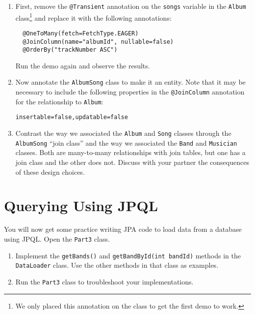 \documentclass[12pt]{scrartcl}
\begin{document}
\begin{enumerate}
  \item First, remove the \texttt{@Transient} annotation on the
  \texttt{songs} variable in the \texttt{Album} class\footnote{We
  only placed this annotation on the class to get the first demo to work.} and
  replace it with the following annotations:

  \begin{verbatim}
  @OneToMany(fetch=FetchType.EAGER)
  @JoinColumn(name="albumId", nullable=false)
  @OrderBy("trackNumber ASC")
  \end{verbatim}
  
  Run the demo again and observe the results.
  \item Now annotate the \texttt{AlbumSong} class to make it an 
  entity.  Note that it may be necessary to include the following properties
  in the \texttt{@JoinColumn} annotation for the relationship to 
  \texttt{Album}:
  
  \texttt{insertable=false,updatable=false}
  
  \item Contrast the way we associated the \texttt{Album} and 
  \texttt{Song} classes through the \texttt{AlbumSong}
  ``join class'' and the way we associated the \texttt{Band} and
  \texttt{Musician} classes.  Both are many-to-many
  relationships with join tables, but one has a join class and the other
  does not.  Discuss with your partner the consequences of these design choices.  
\end{enumerate}

\section*{Querying Using JPQL}

You will now get some practice writing JPA code to load data from a database
using JPQL.  Open the \texttt{Part3} class.  
\begin{enumerate}
  \item Implement the \texttt{getBands()} and 
    \texttt{getBandById(int bandId)} methods in the \texttt{DataLoader}
    class.  Use the other methods in that class as examples.
  \item Run the \texttt{Part3} class to troubleshoot your implementations.
\end{enumerate}
\end{document}
